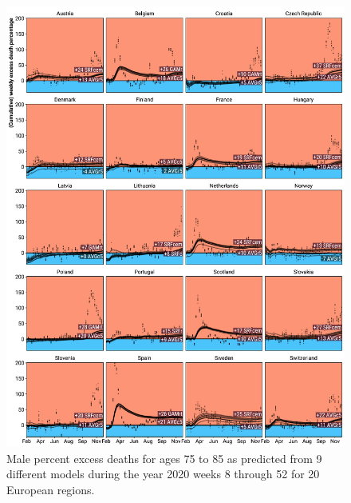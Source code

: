\documentclass[12pt]{article}
\begin{document}
\begin{appendix}
\begin{figure}
\caption{
Male percent excess deaths for ages 75 to 85 as predicted from 9 different models during the year 2020 weeks 8 through 52 for 20 European regions.}
\label{fig:excessm75to85}
\includegraphics{excess_male__75_85_.pdf}
\end{figure}


\end{appendix}
\end{document}
